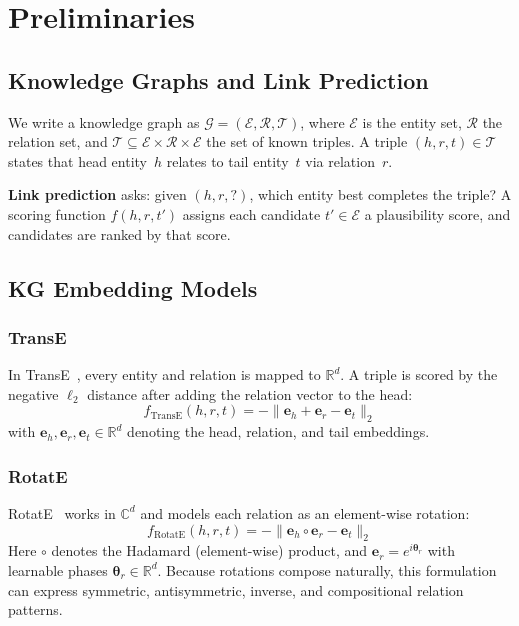 \documentclass[conference, 10pt]{IEEEtran}
\newcommand{\R}{\mathbb{R}}
\newcommand{\C}{\mathbb{C}}
\newcommand{\embed}{\mathbf{e}}
\begin{document}
\section{Preliminaries}
\label{sec:preliminaries}

\subsection{Knowledge Graphs and Link Prediction}

We write a knowledge graph as $\mathcal{G} = (\mathcal{E}, \mathcal{R}, \mathcal{T})$, where $\mathcal{E}$ is the entity set, $\mathcal{R}$ the relation set, and $\mathcal{T} \subseteq \mathcal{E} \times \mathcal{R} \times \mathcal{E}$ the set of known triples. A triple $(h, r, t) \in \mathcal{T}$ states that head entity~$h$ relates to tail entity~$t$ via relation~$r$.

\textbf{Link prediction} asks: given $(h, r, ?)$, which entity best completes the triple? A scoring function $f(h, r, t')$ assigns each candidate $t' \in \mathcal{E}$ a plausibility score, and candidates are ranked by that score.

\subsection{KG Embedding Models}

\subsubsection{TransE}
In TransE~\cite{bordes2013translating}, every entity and relation is mapped to $\R^d$. A triple is scored by the negative $\ell_2$ distance after adding the relation vector to the head:
\begin{equation}
    f_{\text{TransE}}(h, r, t) = -\|\embed_h + \embed_r - \embed_t\|_2
    \label{eq:transe}
\end{equation}
with $\embed_h, \embed_r, \embed_t \in \R^d$ denoting the head, relation, and tail embeddings.

\subsubsection{RotatE}
RotatE~\cite{sun2019rotate} works in $\C^d$ and models each relation as an element-wise rotation:
\begin{equation}
    f_{\text{RotatE}}(h, r, t) = -\|\embed_h \circ \embed_r - \embed_t\|_2
    \label{eq:rotate}
\end{equation}
Here $\circ$ denotes the Hadamard (element-wise) product, and $\embed_r = e^{i\bm{\theta}_r}$ with learnable phases $\bm{\theta}_r \in \R^d$. Because rotations compose naturally, this formulation can express symmetric, antisymmetric, inverse, and compositional relation patterns.
\end{document}
